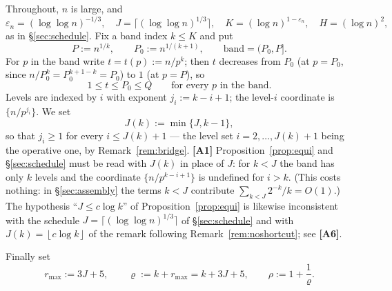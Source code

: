 \documentclass[11pt]{article}
\theoremstyle{definition}
\theoremstyle{plain}
\newcommand{\fl}[1]{\left\lfloor #1\right\rfloor}
\begin{document}
Throughout, $n$ is large, and
\[
\varepsilon_n=(\log\log n)^{-1/3},\quad
J=\bigl\lceil(\log\log n)^{1/3}\bigr\rceil,\quad
K=(\log n)^{1-\varepsilon_n},\quad
H=(\log n)^{2},
\]
as in \S\ref{sec:schedule}.  Fix a band index $k\le K$ and put
\[
P:=n^{1/k},\qquad P_{0}:=n^{1/(k+1)},\qquad
\text{band}=(P_{0},P].
\]
For $p$ in the band write $t=t(p):=n/p^{k}$; then $t$ decreases from
$P_{0}$ (at $p=P_{0}$, since $n/P_{0}^{k}=P_{0}^{k+1-k}=P_{0}$) to $1$
(at $p=P$), so
\begin{equation}\label{eq:trange}
1\le t\le P_{0}\le Q\qquad\text{for every }p\text{ in the band.}
\end{equation}
Levels are indexed by $i$ with exponent $j_{i}:=k-i+1$; the level-$i$
coordinate is $\{n/p^{j_{i}}\}$.  We set
\begin{equation}\label{eq:Jk}
J(k):=\min\{J,k-1\},
\end{equation}
so that $j_{i}\ge1$ for every $i\le J(k)+1$ --- the level set
$i=2,\dots,J(k)+1$ being the operative one, by
Remark~\ref{rem:bridge}.  \textbf{[A1]}
Proposition~\ref{prop:equi} and \S\ref{sec:schedule} must be read with
$J(k)$ in place of $J$: for $k<J$ the band has only $k$ levels and the
coordinate $\{n/p^{k-i+1}\}$ is undefined for $i>k$.  (This costs
nothing: in \S\ref{sec:assembly} the terms $k<J$ contribute
$\sum_{k<J}2^{-k}/k=O(1)$.)  The hypothesis ``$J\le c\log k$'' of
Proposition~\ref{prop:equi} is likewise inconsistent with the schedule
$J=\lceil(\log\log n)^{1/3}\rceil$ of \S\ref{sec:schedule} and with
$J(k)=\fl{c\log k}$ of the remark following
Remark~\ref{rem:noshortcut}; see \textbf{[A6]}.

Finally set
\begin{equation}\label{eq:rmax}
r_{\max}:=3J+5,\qquad \varrho:=k+r_{\max}=k+3J+5,\qquad
\rho:=1+\frac1\varrho .
\end{equation}
\end{document}
